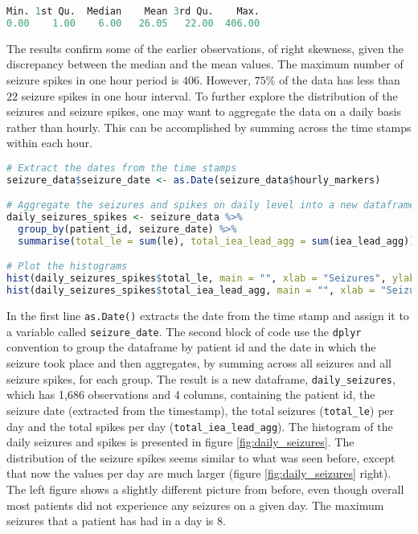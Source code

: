 \begin{lstlisting}[language=R]
Min. 1st Qu.  Median    Mean 3rd Qu.    Max.
0.00    1.00    6.00   26.05   22.00  406.00
\end{lstlisting}
The results confirm some of the earlier observations, of right skewness, given the discrepancy between the median and the mean values. The maximum number of seizure spikes in one hour period is $406$. However, $75\%$ of the data has less than $22$ seizure spikes in one hour interval.
To further explore the distribution of the seizures and seizure spikes, one may want to aggregate the data on a daily basis rather than hourly. This can be accomplished by summing across the time stamps within each hour.
\begin{lstlisting}[language=R]
# Extract the dates from the time stamps
seizure_data$seizure_date <- as.Date(seizure_data$hourly_markers)

# Aggregate the seizures and spikes on daily level into a new dataframe
daily_seizures_spikes <- seizure_data %>%
  group_by(patient_id, seizure_date) %>%
  summarise(total_le = sum(le), total_iea_lead_agg = sum(iea_lead_agg))

# Plot the histograms
hist(daily_seizures_spikes$total_le, main = "", xlab = "Seizures", ylab = "Density", freq=FALSE)
hist(daily_seizures_spikes$total_iea_lead_agg, main = "", xlab = "Seizure Spikes", ylab = "Density", freq=FALSE)
\end{lstlisting}
In the first line \verb|as.Date()| extracts the date from the time stamp and assign it to a variable called \verb|seizure_date|. The second block of code use the \verb|dplyr| convention to group the dataframe by patient id and the date in which the seizure took place and then aggregates, by summing across all seizures and all seizure spikes, for each group. The result is a new dataframe, \verb|daily_seizures|, which has 1,686 observations and 4 columns, containing the patient id, the seizure date (extracted from the timestamp), the total seizures (\verb|total_le|) per day and the total spikes per day (\verb|total_iea_lead_agg|). The histogram of the daily seizures and spikes is presented in figure \ref{fig:daily_seizures}. The distribution of the seizure spikes seems similar to what was seen before, except that now the values per day are much larger (figure \ref{fig:daily_seizures} right). The left figure shows a slightly different picture from before, even though overall most patients did not experience any seizures on a given day. The maximum seizures that a patient has had in a day is $8$.
